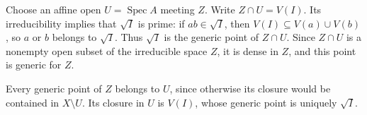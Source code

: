 Choose an affine open $U=\operatorname{Spec}A$ meeting $Z$. Write $Z\cap U=V(I)$. Its irreducibility implies that $\sqrt I$ is prime: if $ab\in\sqrt I$, then $V(I)\subseteq V(a)\cup V(b)$, so $a$ or $b$ belongs to $\sqrt I$. Thus $\sqrt I$ is the generic point of $Z\cap U$. Since $Z\cap U$ is a nonempty open subset of the irreducible space $Z$, it is dense in $Z$, and this point is generic for $Z$.

Every generic point of $Z$ belongs to $U$, since otherwise its closure would be contained in $X\setminus U$. Its closure in $U$ is $V(I)$, whose generic point is uniquely $\sqrt I$.
